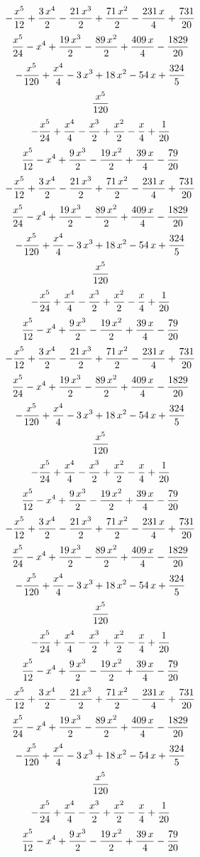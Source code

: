 $$-{{x^5}\over{12}}+{{3\,x^4}\over{2}}-{{21\,x^3}\over{2}}+{{71\,x^2
 }\over{2}}-{{231\,x}\over{4}}+{{731}\over{20}}$$
$${{x^5}\over{24}}-x^4+{{19\,x^3}\over{2}}-{{89\,x^2}\over{2}}+{{409
 \,x}\over{4}}-{{1829}\over{20}}$$
$$-{{x^5}\over{120}}+{{x^4}\over{4}}-3\,x^3+18\,x^2-54\,x+{{324
 }\over{5}}$$
$${{x^5}\over{120}}$$
$$-{{x^5}\over{24}}+{{x^4}\over{4}}-{{x^3}\over{2}}+{{x^2}\over{2}}-
 {{x}\over{4}}+{{1}\over{20}}$$
$${{x^5}\over{12}}-x^4+{{9\,x^3}\over{2}}-{{19\,x^2}\over{2}}+{{39\,x
 }\over{4}}-{{79}\over{20}}$$
$$-{{x^5}\over{12}}+{{3\,x^4}\over{2}}-{{21\,x^3}\over{2}}+{{71\,x^2
 }\over{2}}-{{231\,x}\over{4}}+{{731}\over{20}}$$
$${{x^5}\over{24}}-x^4+{{19\,x^3}\over{2}}-{{89\,x^2}\over{2}}+{{409
 \,x}\over{4}}-{{1829}\over{20}}$$
$$-{{x^5}\over{120}}+{{x^4}\over{4}}-3\,x^3+18\,x^2-54\,x+{{324
 }\over{5}}$$
$${{x^5}\over{120}}$$
$$-{{x^5}\over{24}}+{{x^4}\over{4}}-{{x^3}\over{2}}+{{x^2}\over{2}}-
 {{x}\over{4}}+{{1}\over{20}}$$
$${{x^5}\over{12}}-x^4+{{9\,x^3}\over{2}}-{{19\,x^2}\over{2}}+{{39\,x
 }\over{4}}-{{79}\over{20}}$$
$$-{{x^5}\over{12}}+{{3\,x^4}\over{2}}-{{21\,x^3}\over{2}}+{{71\,x^2
 }\over{2}}-{{231\,x}\over{4}}+{{731}\over{20}}$$
$${{x^5}\over{24}}-x^4+{{19\,x^3}\over{2}}-{{89\,x^2}\over{2}}+{{409
 \,x}\over{4}}-{{1829}\over{20}}$$
$$-{{x^5}\over{120}}+{{x^4}\over{4}}-3\,x^3+18\,x^2-54\,x+{{324
 }\over{5}}$$
$${{x^5}\over{120}}$$
$$-{{x^5}\over{24}}+{{x^4}\over{4}}-{{x^3}\over{2}}+{{x^2}\over{2}}-
 {{x}\over{4}}+{{1}\over{20}}$$
$${{x^5}\over{12}}-x^4+{{9\,x^3}\over{2}}-{{19\,x^2}\over{2}}+{{39\,x
 }\over{4}}-{{79}\over{20}}$$
$$-{{x^5}\over{12}}+{{3\,x^4}\over{2}}-{{21\,x^3}\over{2}}+{{71\,x^2
 }\over{2}}-{{231\,x}\over{4}}+{{731}\over{20}}$$
$${{x^5}\over{24}}-x^4+{{19\,x^3}\over{2}}-{{89\,x^2}\over{2}}+{{409
 \,x}\over{4}}-{{1829}\over{20}}$$
$$-{{x^5}\over{120}}+{{x^4}\over{4}}-3\,x^3+18\,x^2-54\,x+{{324
 }\over{5}}$$
$${{x^5}\over{120}}$$
$$-{{x^5}\over{24}}+{{x^4}\over{4}}-{{x^3}\over{2}}+{{x^2}\over{2}}-
 {{x}\over{4}}+{{1}\over{20}}$$
$${{x^5}\over{12}}-x^4+{{9\,x^3}\over{2}}-{{19\,x^2}\over{2}}+{{39\,x
 }\over{4}}-{{79}\over{20}}$$
$$-{{x^5}\over{12}}+{{3\,x^4}\over{2}}-{{21\,x^3}\over{2}}+{{71\,x^2
 }\over{2}}-{{231\,x}\over{4}}+{{731}\over{20}}$$
$${{x^5}\over{24}}-x^4+{{19\,x^3}\over{2}}-{{89\,x^2}\over{2}}+{{409
 \,x}\over{4}}-{{1829}\over{20}}$$
$$-{{x^5}\over{120}}+{{x^4}\over{4}}-3\,x^3+18\,x^2-54\,x+{{324
 }\over{5}}$$
$${{x^5}\over{120}}$$
$$-{{x^5}\over{24}}+{{x^4}\over{4}}-{{x^3}\over{2}}+{{x^2}\over{2}}-
 {{x}\over{4}}+{{1}\over{20}}$$
$${{x^5}\over{12}}-x^4+{{9\,x^3}\over{2}}-{{19\,x^2}\over{2}}+{{39\,x
 }\over{4}}-{{79}\over{20}}$$

